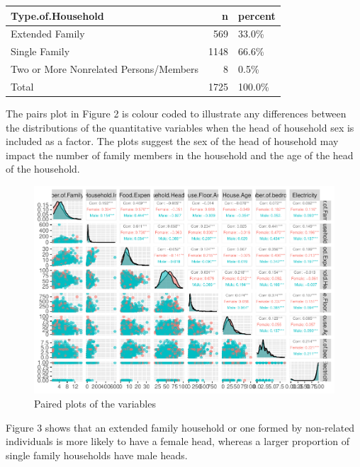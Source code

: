 \documentclass[
]{article}
\begin{document}
\begin{tabular}{lrl}
\toprule
Type.of.Household & n & percent\\
\midrule
Extended Family & 569 & 33.0\%\\
Single Family & 1148 & 66.6\%\\
Two or More Nonrelated Persons/Members & 8 & 0.5\%\\
Total & 1725 & 100.0\%\\
\bottomrule
\end{tabular}

The pairs plot in Figure 2 is colour coded to illustrate any differences
between the distributions of the quantitative variables when the head of
household sex is included as a factor. The plots suggest the sex of the
head of household may impact the number of family members in the
household and the age of the head of the household.

\begin{figure}

{\centering \includegraphics[width=1\linewidth]{Group_01_Project2_demo_files/figure-latex/pairs-1} 

}

\caption{Paired plots of the variables}\label{fig:pairs}
\end{figure}

Figure 3 shows that an extended family household or one formed by
non-related individuals is more likely to have a female head, whereas a
larger proportion of single family households have male heads.
\end{document}
